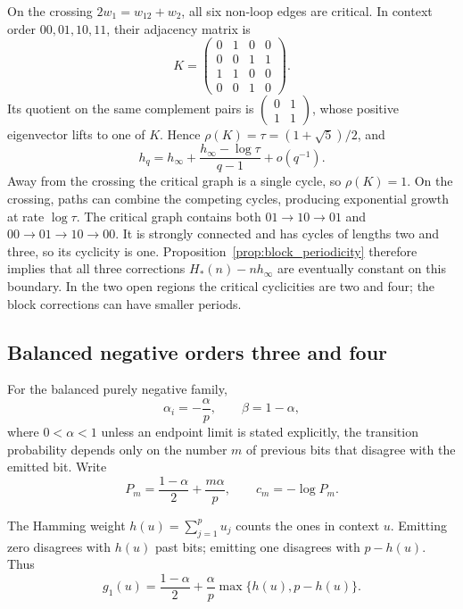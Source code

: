 \documentclass[11pt,a4paper]{article}
\begin{document}
On the crossing $2w_1=w_{12}+w_2$, all six non-loop edges
are critical.  In context order $00,01,10,11$, their adjacency
matrix is
\[
    K=\begin{pmatrix}
    0&1&0&0\\
    0&0&1&1\\
    1&1&0&0\\
    0&0&1&0
    \end{pmatrix}.
\]
Its quotient on the same complement pairs is
$\left(\begin{smallmatrix}0&1\\1&1\end{smallmatrix}\right)$,
whose positive eigenvector lifts to one of $K$.  Hence
$\rho(K)=\tau=(1+\sqrt5)/2$, and
\begin{equation}
\label{eq:golden_correction}
    h_q=h_\infty+
       \frac{h_\infty-\log\tau}{q-1}+o(q^{-1}).
\end{equation}
Away from the crossing the critical graph is a single cycle, so
$\rho(K)=1$.  On the crossing, paths can combine the competing
cycles, producing exponential growth at rate $\log\tau$.
The critical graph contains both $01\to10\to01$ and
$00\to01\to10\to00$.  It is strongly connected and has cycles
of lengths two and three, so its cyclicity is one.
Proposition~\ref{prop:block_periodicity} therefore implies that all
three corrections $H_*(n)-nh_\infty$ are eventually constant on
this boundary.  In the two open regions the critical cyclicities
are two and four; the block corrections can have smaller periods.

\subsection{Balanced negative orders three and four}

For the balanced purely negative family,
\[
    \alpha_i=-\frac{\alpha}{p},
    \qquad \beta=1-\alpha,
\]
where $0<\alpha<1$ unless an endpoint limit is stated explicitly,
the transition probability depends only on the number $m$ of previous
bits that disagree with the emitted bit.  Write
\begin{equation}
\label{eq:balanced_cost}
    P_m=\frac{1-\alpha}{2}+\frac{m\alpha}{p},
    \qquad c_m=-\log P_m.
\end{equation}

The Hamming weight $h(u)=\sum_{j=1}^p u_j$ counts the ones in
context $u$.  Emitting zero disagrees with $h(u)$ past bits;
emitting one disagrees with $p-h(u)$.  Thus
\begin{equation}
\label{eq:hamming_weight_guessability}
    g_1(u)=\frac{1-\alpha}{2}
       +\frac{\alpha}{p}\max\{h(u),p-h(u)\}.
\end{equation}
\end{document}
